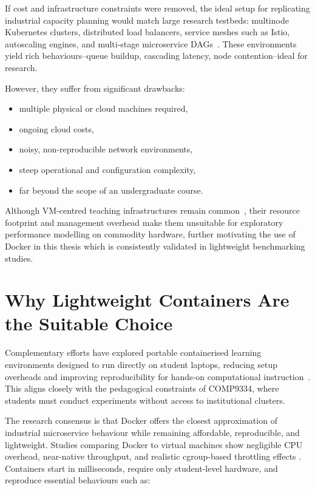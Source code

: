 If cost and infrastructure constraints were removed, the ideal setup for replicating industrial capacity planning would match large research testbeds: multinode Kubernetes clusters, distributed load balancers, service meshes such as Istio, autoscaling engines, and multi-stage microservice DAGs~\cite{HPCBenchmark2018,IstioPerf2020}. These environments yield rich behaviours--queue buildup, cascading latency, node contention--ideal for research.

However, they suffer from significant drawbacks:

\begin{itemize}
    \item multiple physical or cloud machines required,
    \item ongoing cloud costs,
    \item noisy, non-reproducible network environments,
    \item steep operational and configuration complexity,
    \item far beyond the scope of an undergraduate course.
\end{itemize}

Although VM-centred teaching infrastructures remain common~\cite{KaunasInfra}, their resource footprint and management overhead make them unsuitable for exploratory performance modelling on commodity hardware, further motivating the use of Docker in this thesis which is consistently validated in lightweight benchmarking studies.

\section{Why Lightweight Containers Are the Suitable Choice}

Complementary efforts have explored portable containerised learning environments designed to run directly on student laptops, reducing setup overheads and improving reproducibility for hands-on computational instruction~\cite{PortableHandsOn}. This aligns closely with the pedagogical constraints of COMP9334, where students must conduct experiments without access to institutional clusters.

The research consensus is that Docker offers the closest approximation of
industrial microservice behaviour while remaining affordable,
reproducible, and lightweight. Studies comparing Docker to virtual
machines show negligible CPU overhead, near-native throughput, and
realistic cgroup-based throttling effects \cite{Felteretal, Xavieretal}.
Containers start in milliseconds, require only student-level hardware,
and reproduce essential behaviours such as:

